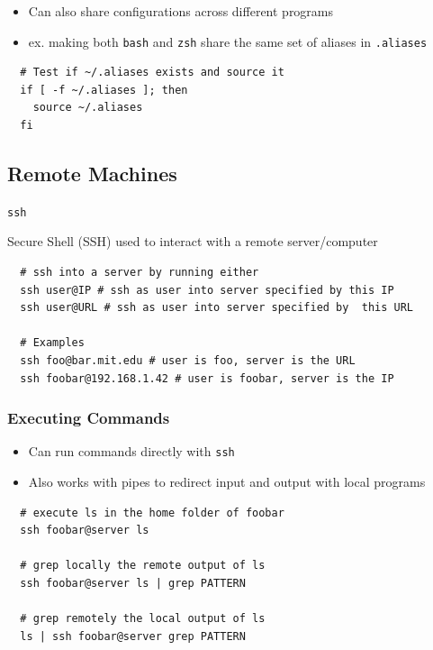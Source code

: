 \documentclass[letterpaper,12pt]{article}
\newcommand*{\lstitem}[1]{
  \setbox0\hbox{\lstinline{#1}}
  \item[\usebox0]
}
\begin{document}
\begin{itemize}
 \item Can also share configurations across different programs
 \item ex. making both \lstinline{bash} and \lstinline{zsh} share the same set of aliases in \lstinline{.aliases}
\end{itemize}

\begin{lstlisting}
  # Test if ~/.aliases exists and source it
  if [ -f ~/.aliases ]; then
    source ~/.aliases
  fi
\end{lstlisting}

\subsection{Remote Machines}

\begin{description}
 \lstitem{ssh} Secure Shell (SSH) used to interact with a remote server/computer
\end{description}

\begin{lstlisting}
  # ssh into a server by running either
  ssh user@IP # ssh as user into server specified by this IP
  ssh user@URL # ssh as user into server specified by  this URL

  # Examples
  ssh foo@bar.mit.edu # user is foo, server is the URL
  ssh foobar@192.168.1.42 # user is foobar, server is the IP
\end{lstlisting}

\subsubsection{Executing Commands}
\begin{itemize}
 \item Can run commands directly with \lstinline{ssh}
 \item Also works with pipes to redirect input and output with local programs
\end{itemize}

\begin{lstlisting}
  # execute ls in the home folder of foobar
  ssh foobar@server ls

  # grep locally the remote output of ls
  ssh foobar@server ls | grep PATTERN

  # grep remotely the local output of ls
  ls | ssh foobar@server grep PATTERN
\end{lstlisting}
\end{document}
